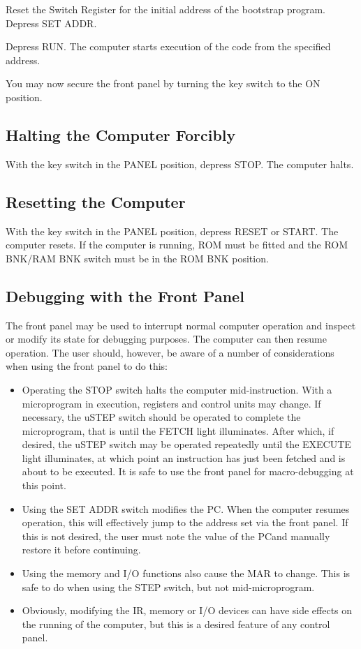 \documentclass[11pt,a4paper,twocolumns]{article}
\newcommand{\lt}[1]{\textsf{#1}}
\newcommand{\sw}[1]{\textsf{#1}}
\newcommand\register[1]{\textsf{#1}}
\newcommand\MAR{\register{MAR}}
\newcommand\PC{\register{PC}}
\newcommand\IR{\register{IR}}
\begin{document}
Reset the Switch Register for the initial address of the bootstrap
program. Depress \sw{SET ADDR}.

Depress \sw{RUN}. The computer starts execution of the code from the
specified address.

You may now secure the front panel by turning the key switch to the
\sw{ON} position.

\subsection{Halting the Computer Forcibly}

With the key switch in the \sw{PANEL} position, depress \sw{STOP}. The
computer halts.

\subsection{Resetting the Computer}

With the key switch in the \sw{PANEL} position, depress \sw{RESET} or
\sw{START}. The computer resets. If the computer is running, ROM must
be fitted and the \sw{ROM BNK}/\sw{RAM BNK} switch must be in the
\sw{ROM BNK} position.

\subsection{Debugging with the Front Panel}

The front panel may be used to interrupt normal computer operation and
inspect or modify its state for debugging purposes. The computer can
then resume operation. The user should, however, be aware of a number
of considerations when using the front panel to do this:

\begin{itemize}
\item Operating the \sw{STOP} switch halts the computer
  mid-instruction. With a microprogram in execution, registers and
  control units may change. If necessary, the \sw{uSTEP} switch should
  be operated to complete the microprogram, that is until the
  \lt{FETCH} light illuminates. After which, if desired, the
  \sw{uSTEP} switch may be operated repeatedly until the \lt{EXECUTE}
  light illuminates, at which point an instruction has just been
  fetched and is about to be executed. It is safe to use the front
  panel for macro-debugging at this point.
\item Using the \sw{SET ADDR} switch modifies the \PC. When the
  computer resumes operation, this will effectively jump to the
  address set via the front panel. If this is not desired, the user
  must note the value of the \PC and manually restore it before
  continuing.
\item Using the memory and I/O functions also cause the \MAR{} to
  change. This is safe to do when using the {\sf STEP} switch, but not
  mid-microprogram.
\item Obviously, modifying the \IR{}, memory or I/O devices can have
  side effects on the running of the computer, but this is a desired
  feature of any control panel.
\end{itemize}
\end{document}
